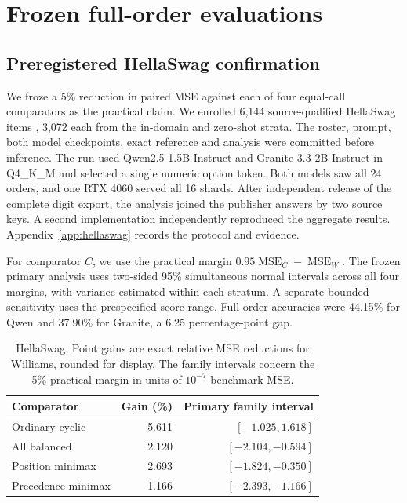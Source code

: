 \documentclass{article}
\begin{document}
\section{Frozen full-order evaluations}
\subsection{Preregistered HellaSwag confirmation}
We froze a 5\% reduction in paired MSE against each of four
equal-call comparators as the practical claim. We enrolled 6,144
source-qualified HellaSwag items \citep{zellers2019hellaswag},
3,072 each from the in-domain and zero-shot strata. The roster,
prompt, both model checkpoints, exact reference and analysis
were committed before inference. The run used Qwen2.5-1.5B-Instruct
and Granite-3.3-2B-Instruct in Q4\_K\_M and selected a single
numeric option token. Both models saw all 24 orders, and one
RTX 4060 served all 16 shards. After independent release of the
complete digit export, the analysis joined the publisher answers
by two source keys. A second implementation independently
reproduced the aggregate results. Appendix~\ref{app:hellaswag}
records the protocol and evidence.

For comparator \(C\), we use the practical margin
\(0.95\operatorname{MSE}_{C}-\operatorname{MSE}_{W}\).
The frozen primary analysis uses two-sided 95\% simultaneous
normal intervals across all four margins, with variance estimated
within each stratum. A separate bounded sensitivity uses the
prespecified score range. Full-order accuracies were 44.15\% for
Qwen and 37.90\% for Granite, a 6.25 percentage-point gap.

\begin{table}[t]
\caption{HellaSwag. Point gains are exact relative MSE reductions
for Williams, rounded for display. The family intervals concern the
5\% practical margin in units of \(10^{-7}\) benchmark MSE.}
\label{tab:hellaswag}
\centering
\small
\setlength{\tabcolsep}{4pt}
\begin{tabular}{@{}lrr@{}}
\toprule
Comparator & Gain (\%) & Primary family interval \\
\midrule
Ordinary cyclic & 5.611 & $[-1.025,1.618]$ \\
All balanced & 2.120 & $[-2.104,-0.594]$ \\
Position minimax & 2.693 & $[-1.824,-0.350]$ \\
Precedence minimax & 1.166 & $[-2.393,-1.166]$ \\
\bottomrule
\end{tabular}
\end{table}
\end{document}
